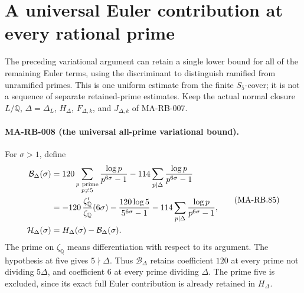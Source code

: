 \section{A universal Euler contribution at every rational prime}
\label{sec:s5-universal-euler}

The preceding variational argument can retain a single
lower bound for all of the remaining Euler terms,
using the discriminant to distinguish ramified from
unramified primes. This is one uniform estimate from
the finite \(S_5\)-cover; it is not a sequence of
separate retained-prime estimates.
Keep the actual normal closure \(L/\mathbb Q\),
\(\Delta=\Delta_L\), \(H_\Delta\), \(F_{\Delta,k}\),
and \(J_{\Delta,k}\) of MA-RB-007.

\paragraph{MA-RB-008 (the universal all-prime variational bound).}
For \(\sigma>1\), define
\[
 \begin{split}
 \mathcal B_\Delta(\sigma)
   &=120\sum_{\substack{p\ {\rm prime}\\p\ne5}}
                   \frac{\log p}{p^{6\sigma}-1}
        -114\sum_{p\mid\Delta}\frac{\log p}{p^{6\sigma}-1}\\
   &=-120\,\frac{\zeta_{\mathbb Q}'}{\zeta_{\mathbb Q}}(6\sigma)
       -\frac{120\log5}{5^{6\sigma}-1}
        -114\sum_{p\mid\Delta}\frac{\log p}{p^{6\sigma}-1},\\
 \mathcal H_\Delta(\sigma)
   &=H_\Delta(\sigma)-\mathcal B_\Delta(\sigma).
 \end{split}
 \tag{MA-RB.85}
\]
The prime on \(\zeta_{\mathbb Q}\) means differentiation
with respect to its argument. The hypothesis at five
gives \(5\nmid\Delta\). Thus \(\mathcal B_\Delta\)
retains coefficient \(120\) at every prime not dividing
\(5\Delta\), and coefficient \(6\) at every prime
dividing \(\Delta\). The prime five is excluded, since
its exact full Euler contribution is already retained
in \(H_\Delta\).

